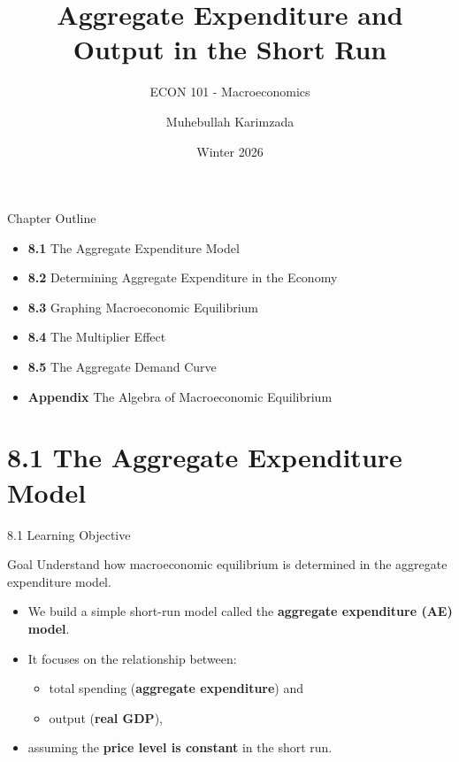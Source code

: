 \documentclass[aspectratio=169]{beamer}
\title{\textbf{Aggregate Expenditure and Output in the Short Run \vspace{.5cm}\\  }}
\subtitle{ {\large ECON 101 - Macroeconomics}}
\author{Muhebullah Karimzada}
\date{Winter 2026}
\begin{document}
\begin{frame}[plain]
  \titlepage
\end{frame}

\begin{frame}{Chapter Outline}
\transfade
\begin{itemize}[<+->]
  \item \textbf{8.1} The Aggregate Expenditure Model
  \item \textbf{8.2} Determining Aggregate Expenditure in the Economy
  \item \textbf{8.3} Graphing Macroeconomic Equilibrium
  \item \textbf{8.4} The Multiplier Effect
  \item \textbf{8.5} The Aggregate Demand Curve
  \item \textbf{Appendix} The Algebra of Macroeconomic Equilibrium
\end{itemize}
\end{frame}

\section{8.1 The Aggregate Expenditure Model}

\begin{frame}{8.1 Learning Objective}
\transfade
\begin{block}{Goal}
Understand how macroeconomic equilibrium is determined in the aggregate expenditure model.
\end{block}
\begin{itemize}[<+->]
  \item We build a simple short-run model called the \textbf{aggregate expenditure (AE) model}.
  \item It focuses on the relationship between:
  \begin{itemize}[<+->]
    \item total spending (\textbf{aggregate expenditure}) and
    \item output (\textbf{real GDP}),
  \end{itemize}
  \item assuming the \textbf{price level is constant} in the short run.
\end{itemize}
\end{frame}
\end{document}

